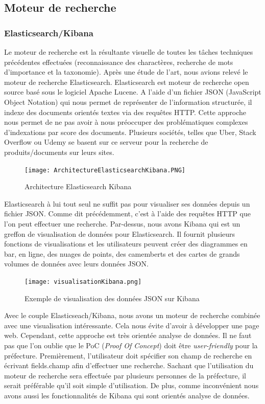  

\subsection{Moteur de recherche} %
\subsubsection{Elasticsearch/Kibana}
Le moteur de recherche est la résultante visuelle de toutes les tâches techniques précédentes effectuées (reconnaissance des charactères, recherche de mots d’importance et la taxonomie). Après une étude de l’art, nous avions relevé le moteur de recherche Elasticsearch. 
Elasticsearch est moteur de recherche open source basé sous le logiciel Apache Lucene. A l’aide d’un fichier JSON (JavaScript Object Notation) qui nous permet de représenter de l’information structurée, il indexe des documents orientés textes via des requêtes HTTP. Cette approche nous permet de ne pas avoir à nous préoccuper des problématiques complexes d’indexations par score des documents. Plusieurs sociétés, telles que Uber, Stack Overflow ou Udemy se basent sur ce serveur pour la recherche de produits/documents sur leurs sites. 

\begin{figure}[h!]
  \centering
  \texttt{[image: ArchitectureElasticsearchKibana.PNG]}
	\caption[]{Architecture Elasticsearch Kibana}
  \label{}
\end{figure}


Elasticsearch à lui tout seul ne suffit pas pour visualiser ses données depuis un fichier JSON. Comme dit précédemment, c’est à l’aide des requêtes HTTP que l’on peut effectuer une recherche. Par-dessus, nous avons Kibana qui est un greffon de visualisation de données pour Elasticsearch. Il fournit plusieurs fonctions de visualisations et les utilisateurs peuvent créer des diagrammes en bar, en ligne, des nuages de points, des camemberts et des cartes de grands volumes de données avec leurs données JSON.

\begin{figure}[h!]
  \centering
  \texttt{[image: visualisationKibana.png]}
	\caption[]{Exemple de visualisation des données JSON sur Kibana}
  \label{}
\end{figure}


Avec le couple Elasticseach/Kibana, nous avons un moteur de recherche combinée avec une visualisation intéressante. Cela nous évite d’avoir à développer une page web. 
Cependant, cette approche est très orientée analyse de données. Il ne faut pas que l’on oublie que le PoC (\textit{Proof Of Concept}) doit être \textit{user-friendly} pour la préfecture. Premièrement, l’utilisateur doit spécifier son champ de recherche en écrivant fields.champ afin d’effectuer une recherche. Sachant que l’utilisation du moteur de recherche sera effectuée par plusieurs personnes de la préfecture, il serait préférable qu’il soit simple d’utilisation. De plus, comme inconvénient nous avons aussi les fonctionnalités de Kibana qui sont orientés analyse de données.

